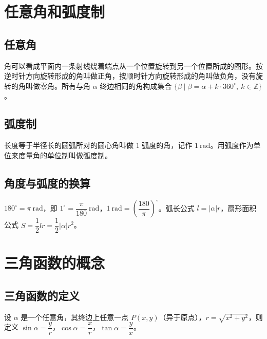 
\section{任意角和弧度制}
\subsection{任意角}
\begin{definition}[任意角]
角可以看成平面内一条射线绕着端点从一个位置旋转到另一个位置所成的图形。按逆时针方向旋转形成的角叫做正角，按顺时针方向旋转形成的角叫做负角，没有旋转的角叫做零角。所有与角 $\alpha$ 终边相同的角构成集合 $\{\beta \mid \beta=\alpha+k\cdot 360^\circ,\ k \in \mathbb{Z}\}$。
\end{definition}
\subsection{弧度制}
\begin{definition}[弧度制]
长度等于半径长的圆弧所对的圆心角叫做 $1$ 弧度的角，记作 $1\ \mathrm{rad}$。用弧度作为单位来度量角的单位制叫做弧度制。
\end{definition}
\subsection{角度与弧度的换算}
\begin{definition}[角度与弧度的换算]
$180^\circ=\pi\ \mathrm{rad}$，即 $1^\circ=\dfrac{\pi}{180}\ \mathrm{rad}$，$1\ \mathrm{rad}=\left(\dfrac{180}{\pi}\right)^\circ$。弧长公式 $l=|\alpha| r$，扇形面积公式 $S=\dfrac{1}{2}lr=\dfrac{1}{2}|\alpha|r^2$。
\end{definition}

\section{三角函数的概念}
\subsection{三角函数的定义}
\begin{definition}[三角函数的定义]
设 $\alpha$ 是一个任意角，其终边上任意一点 $P(x,y)$（异于原点），$r=\sqrt{x^2+y^2}$，则定义 $\sin\alpha=\dfrac{y}{r}$，$\cos\alpha=\dfrac{x}{r}$，$\tan\alpha=\dfrac{y}{x}$。
\end{definition}
